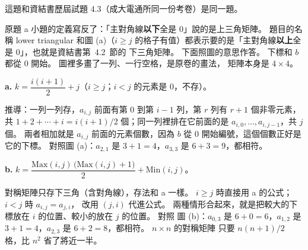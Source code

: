 \begin{pastsoln}
這題和資結書歷屆試題 4.3（成大電通所同一份考卷）是同一題。

原題 a 小題的定義寫反了：「主對角線\textbf{以下}全是 $0$」說的是上三角矩陣。 題目的名稱 lower triangular
和圖 (a)（$i \ge j$ 的格子有值）都表示要的是「主對角線\textbf{以上}全是 $0$」，也就是資結書第~4.2~節的
下三角矩陣。 下面照圖的意思作答。 下標和 $b$ 都從 $0$ 開始。 圖裡多畫了一列、一行空格，是原卷的畫法，
矩陣本身是 $4 \times 4$。

\textbf{a.} $k = \dfrac{i(i+1)}{2} + j$（$i \ge j$；$i < j$ 的元素是 $0$，不存）。

推導：一列一列存，$a_{i,j}$ 前面有第 $0$ 到第 $i - 1$ 列，第 $r$ 列有 $r + 1$ 個非零元素，共
$1 + 2 + \cdots + i = i(i+1)/2$ 個；同一列裡排在它前面的是 $a_{i,0}, \ldots, a_{i,j-1}$，共 $j$ 個。 兩者相加就是
$a_{i,j}$ 前面的元素個數，因為 $b$ 從 $0$ 開始編號，這個個數正好是它的下標。 對照圖 (a)：$a_{2,1}$ 是
$3 + 1 = 4$，$a_{3,3}$ 是 $6 + 3 = 9$，都相符。

\textbf{b.} $k = \dfrac{\mathrm{Max}(i,j)\,\bigl(\mathrm{Max}(i,j) + 1\bigr)}{2} + \mathrm{Min}(i,j)$。

對稱矩陣只存下三角（含對角線），存法和 a 一樣。 $i \ge j$ 時直接用 a 的公式；$i < j$ 時 $a_{i,j} = a_{j,i}$，
改用 $(j, i)$ 代進公式。 兩種情形合起來，就是把較大的下標放在 $i$ 的位置、較小的放在 $j$ 的位置。 對照
圖 (b)：$a_{0,3}$ 是 $6 + 0 = 6$，$a_{1,2}$ 是 $3 + 1 = 4$，$a_{2,3}$ 是 $6 + 2 = 8$，都相符。 $n \times n$ 的對稱矩陣
只要 $n(n+1)/2$ 格，比 $n^2$ 省了將近一半。
\end{pastsoln}

